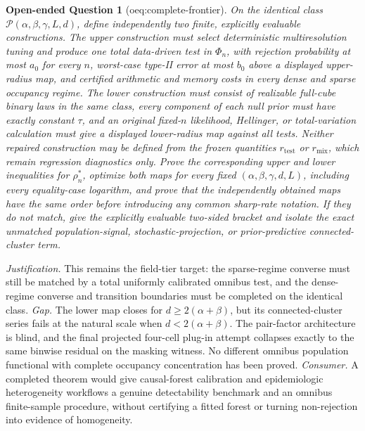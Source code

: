 \documentclass{article}
\newtheorem{openendedquestion}{Open-ended Question}
\begin{document}
\begin{openendedquestion}[oeq:complete-frontier]\label{oeq:complete-frontier}
On the identical class \(\mathcal P(\alpha,\beta,\gamma,L,d)\), define independently two finite, explicitly evaluable constructions.  The upper construction must select deterministic multiresolution tuning and produce one total data-driven test in \(\Phi_n\), with rejection probability at most \(a_0\) for every \(n\), worst-case type-II error at most \(b_0\) above a displayed upper-radius map, and certified arithmetic and memory costs in every dense and sparse occupancy regime.  The lower construction must consist of realizable full-cube binary laws in the same class, every component of each null prior must have exactly constant \(\tau\), and an original fixed-\(n\) likelihood, Hellinger, or total-variation calculation must give a displayed lower-radius map against all tests.  Neither repaired construction may be defined from the frozen quantities \(r_{\mathrm{test}}\) or \(r_{\mathrm{mix}}\), which remain regression diagnostics only.  Prove the corresponding upper and lower inequalities for \(\rho_n^*\), optimize both maps for every fixed \((\alpha,\beta,\gamma,d,L)\), including every equality-case logarithm, and prove that the independently obtained maps have the same order before introducing any common sharp-rate notation.  If they do not match, give the explicitly evaluable two-sided bracket and isolate the exact unmatched population-signal, stochastic-projection, or prior-predictive connected-cluster term.
\end{openendedquestion}
\par\smallskip\noindent \textit{Justification.} This remains the field-tier target: the sparse-regime converse must still be matched by a total uniformly calibrated omnibus test, and the dense-regime converse and transition boundaries must be completed on the identical class. \textit{Gap.} The lower map closes for \(d\geq2(\alpha+\beta)\), but its connected-cluster series fails at the natural scale when \(d<2(\alpha+\beta)\).  The pair-factor architecture is blind, and the final projected four-cell plug-in attempt collapses exactly to the same binwise residual on the masking witness.  No different omnibus population functional with complete occupancy concentration has been proved. \textit{Consumer.} A completed theorem would give causal-forest calibration and epidemiologic heterogeneity workflows a genuine detectability benchmark and an omnibus finite-sample procedure, without certifying a fitted forest or turning non-rejection into evidence of homogeneity.
\end{document}
